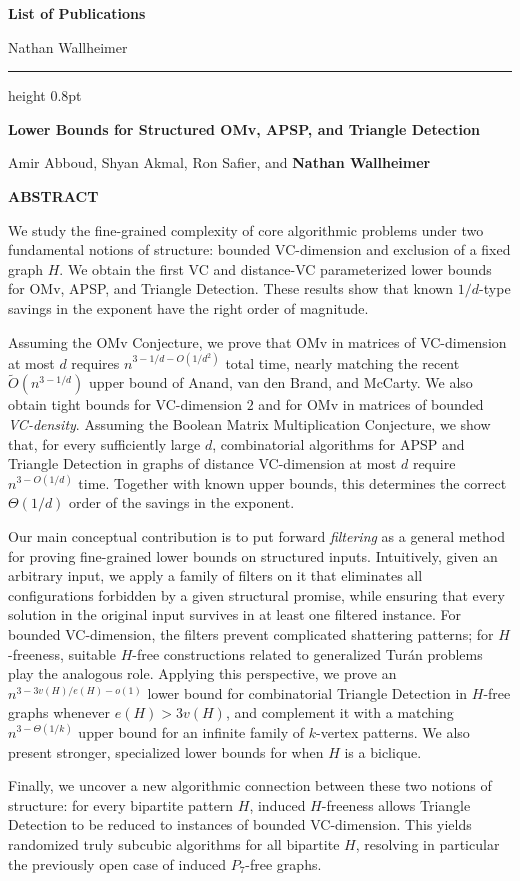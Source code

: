 \documentclass[10pt,a4paper]{article}
\newcommand{\tOrder}{\widetilde O}
\newcommand{\nathanauthor}{\textbf{\color{navy}Nathan Wallheimer}}
\newcommand{\publicationheading}[4]{%
  \Needspace{7\baselineskip}%
  \par\addvspace{1.25em}%
  \begingroup\raggedright
  {\large\bfseries\color{navy}#1}%
  \hspace{0.5em}{\footnotesize\bfseries\color{teal}\mbox{[#2]}}%
  \if\relax\detokenize{#3}\relax
  \else
    \enspace{\footnotesize[\href{#3}{link}]}%
  \fi
  \par\endgroup\nobreak\vspace{0.2em}%
  {\small\color{ink}#4}%
  \par\nobreak\vspace{0.35em}%
  {\footnotesize\bfseries\color{ink}\MakeUppercase{Abstract}}%
  \par\nobreak\vspace{0.15em}%
}
\newenvironment{publicationabstract}
  {\begingroup\small\color{ink}\setlength{\parskip}{0.48em}}
  {\par\endgroup}
\begin{document}
{\Huge\bfseries\color{navy}List of Publications}\par
\vspace{0.2em}
{\large\color{ink}Nathan Wallheimer}\par
\vspace{0.45em}
{\color{rulegray}\hrule height 0.8pt}

\publicationheading
  {Lower Bounds for Structured OMv, APSP, and Triangle Detection}
  {To appear in ITCS 2027}
  {}
  {Amir Abboud, Shyan Akmal, Ron Safier, and \nathanauthor}
\begin{publicationabstract}
We study the fine-grained complexity of core algorithmic problems under two fundamental notions of structure: bounded VC-dimension and exclusion of a fixed graph $H$. We obtain the first VC and distance-VC parameterized lower bounds for OMv, APSP, and Triangle Detection.
These results show that known $1/d$-type savings in the exponent have the right order of magnitude.

Assuming the OMv Conjecture, we prove that OMv in matrices of VC-dimension at most $d$ requires $n^{3-1/d-O(1/d^2)}$ total time, nearly matching the recent $\tOrder(n^{3-1/d})$ upper bound of Anand, van den Brand, and McCarty. We also obtain tight bounds for VC-dimension $2$ and for OMv in matrices of bounded \emph{VC-density}. Assuming the Boolean Matrix Multiplication Conjecture, we show that, for every sufficiently large $d$, combinatorial algorithms for APSP and Triangle Detection in graphs of distance VC-dimension at most $d$ require $n^{3-O(1/d)}$ time. Together with known upper bounds, this determines the correct $\Theta(1/d)$ order of the savings in the exponent.

Our main conceptual contribution is to put forward \emph{filtering} as a general method for proving fine-grained lower bounds on structured inputs.
Intuitively, given an arbitrary input, we apply a family of filters on it that eliminates all configurations forbidden by a given structural promise, while ensuring that every solution in the original input survives in at least one filtered instance.
For bounded VC-dimension, the filters prevent complicated shattering patterns; for $H$-freeness, suitable $H$-free constructions related to generalized Tur\'an problems play the analogous role. Applying this perspective, we prove an $n^{3-3v(H)/e(H)-o(1)}$ lower bound for combinatorial Triangle Detection in $H$-free graphs whenever $e(H)>3v(H)$, and complement it with a matching $n^{3-\Theta(1/k)}$ upper bound for an infinite family of $k$-vertex patterns.
We also present stronger, specialized lower bounds for when $H$ is a biclique.

Finally, we uncover a new algorithmic connection between these two notions of structure: for every bipartite pattern $H$, induced $H$-freeness allows Triangle Detection to be reduced to instances of bounded VC-dimension. This yields randomized truly subcubic algorithms for all bipartite $H$, resolving in particular the previously open case of induced $P_7$-free graphs.
\end{publicationabstract}
\end{document}
